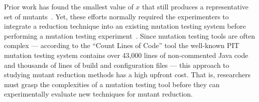 

Prior work has found the smallest value of $x$ that still produces a representative set of
mutants~\cite{jia2011analysis, mathur1994empirical}. Yet, these efforts normally required the experimenters to integrate
a reduction technique into an existing mutation testing system before performing a mutation testing
experiment~\cite{demillo1988extended, king1991fortran}. Since mutation testing tools are often complex --- according to
the ``Count Lines of Code'' tool the  well-known PIT mutation testing system contains over 43,000 lines of non-commented
Java code and thousands of lines of build and configuration files --- this approach to studying mutant reduction methods
has a high upfront cost. That is, researchers must grasp the complexities of a mutation testing tool before they can
experimentally evaluate new techniques for mutant reduction.



